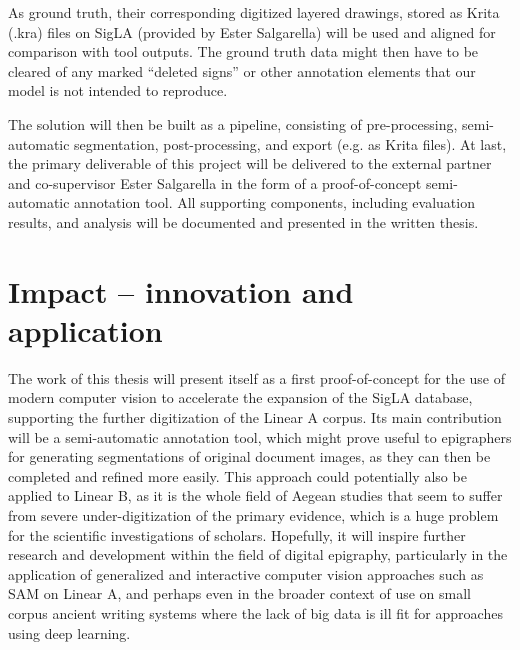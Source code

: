 As ground truth, their corresponding digitized layered drawings, stored as Krita (.kra) files on SigLA (provided by Ester Salgarella) will be used and aligned for comparison with tool outputs.
The ground truth data might then have to be cleared of any marked 
“deleted signs” or other annotation elements that our model is not intended to reproduce.

The solution will then be built as a pipeline, consisting of
pre-processing, semi-automatic segmentation, post-processing, and export (e.g. as Krita files).
At last, the primary deliverable of this project will be delivered to the external partner and co-supervisor Ester Salgarella in the form of a proof-of-concept semi-automatic annotation tool.
All supporting components, 
including evaluation results, and analysis will be documented and presented in the written 
thesis. 

\section{Impact -- innovation and application}

The work of this thesis will present itself as a first proof-of-concept for the use of modern computer vision to accelerate the expansion of the SigLA database, supporting the further digitization of the Linear A corpus.
Its main contribution will be a semi-automatic annotation tool, which might prove useful to epigraphers for generating segmentations of original document images, as they can then be completed and refined more easily.
This approach could potentially also be applied to Linear B, as it is the whole field of Aegean studies that seem to suffer from severe under-digitization of the primary evidence, which is a huge problem for the scientific investigations of scholars.
Hopefully, it will inspire further research and development within the field of digital epigraphy, particularly in the application of generalized and interactive computer vision approaches such as \acs{SAM} on Linear A, and perhaps even in the broader context of use on small corpus ancient writing systems where the lack of big data is ill fit for approaches using deep learning.

